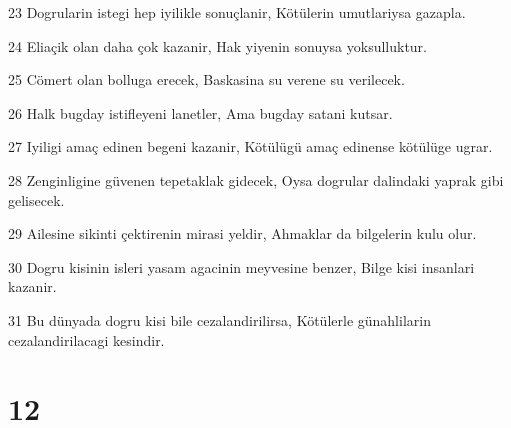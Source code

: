 \par 23 Dogrularin istegi hep iyilikle sonuçlanir, Kötülerin umutlariysa gazapla.
\par 24 Eliaçik olan daha çok kazanir, Hak yiyenin sonuysa yoksulluktur.
\par 25 Cömert olan bolluga erecek, Baskasina su verene su verilecek.
\par 26 Halk bugday istifleyeni lanetler, Ama bugday satani kutsar.
\par 27 Iyiligi amaç edinen begeni kazanir, Kötülügü amaç edinense kötülüge ugrar.
\par 28 Zenginligine güvenen tepetaklak gidecek, Oysa dogrular dalindaki yaprak gibi gelisecek.
\par 29 Ailesine sikinti çektirenin mirasi yeldir, Ahmaklar da bilgelerin kulu olur.
\par 30 Dogru kisinin isleri yasam agacinin meyvesine benzer, Bilge kisi insanlari kazanir.
\par 31 Bu dünyada dogru kisi bile cezalandirilirsa, Kötülerle günahlilarin cezalandirilacagi kesindir.

\chapter{12}

